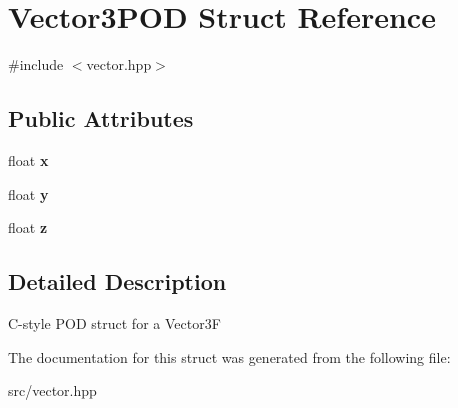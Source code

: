\hypertarget{struct_vector3_p_o_d}{}\section{Vector3\+P\+OD Struct Reference}
\label{struct_vector3_p_o_d}


{\ttfamily \#include $<$vector.\+hpp$>$}

\subsection*{Public Attributes}
\begin{DoxyCompactItemize}
\item 
\mbox{\label{struct_vector3_p_o_d_a20697d084c23e3126914c6a10c300073}} 
float {\bfseries x}
\item 
\mbox{\label{struct_vector3_p_o_d_a00596acd41b53ab2b5a2667239d81083}} 
float {\bfseries y}
\item 
\mbox{\label{struct_vector3_p_o_d_a7fd1670144f56971ad09dc1887fb741b}} 
float {\bfseries z}
\end{DoxyCompactItemize}


\subsection{Detailed Description}
C-\/style P\+OD struct for a Vector3F 

The documentation for this struct was generated from the following file\+:\begin{DoxyCompactItemize}
\item 
src/vector.\+hpp\end{DoxyCompactItemize}
